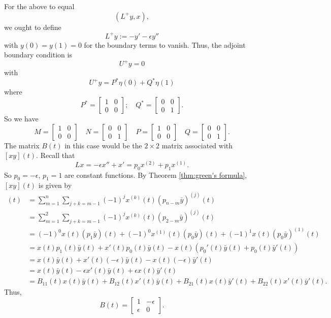 \documentclass[11pt, oneside, a4paper]{article}
\begin{document}
For the above to equal
\[(L^+y, x),\]
we ought to define
\[
    L^+y := -y' - \epsilon y''  
\]
with $y(0)=y(1)=0$ for the boundary terms to vanish. Thus, the adjoint boundary condition is
\[U^+y=0\] with
\[U^+y = P^*\eta(0) + Q^*\eta(1)\] where 
\[P^* = \begin{bmatrix} 1 & 0\\0 & 0 \end{bmatrix};\quad 
Q^* = \begin{bmatrix} 0 & 0\\ 0 & 1\end{bmatrix}.\]
So we have
\[M = \begin{bmatrix} 1 & 0\\0 & 0 \end{bmatrix} \quad 
N = \begin{bmatrix} 0 & 0\\ 0 & 1\end{bmatrix} \quad
P = \begin{bmatrix} 1 & 0\\0 & 0 \end{bmatrix} \quad 
Q = \begin{bmatrix} 0 & 0\\ 0 & 1\end{bmatrix}.\]
The matrix $B(t)$ in this case would be the $2\times 2$ matrix associated with $[xy](t)$. Recall that 
\[Lx = -\epsilon x'' + x'= p_0x^{(2)} + p_1x^{(1)}.\]
So $p_0=-\epsilon$, $p_1=1$ are constant functions.
By Theorem \ref{thm:green's formula}, $[xy](t)$ is given by
\begin{align*}
    [xy](t) &= \sum_{m=1}^n\sum_{j+k=m-1}(-1)^j x^{(k)}(t)(p_{n-m}\bar{y})^{(j)}(t)\\
    &= \sum_{m=1}^2\sum_{j+k=m-1}(-1)^j x^{(k)}(t)(p_{2-m}\bar{y})^{(j)}(t)\\
    &= (-1)^0x(t)(p_1\bar{y})(t) + (-1)^0x^{(1)}(t)(p_0\bar{y})(t) + (-1)^1x(t)(p_0\bar{y})^{(1)}(t)\\
    &= x(t)p_1(t)\bar{y}(t) + x'(t)p_0(t)\bar{y}(t) - x(t)(p_0'(t)\bar{y}(t) + p_0(t)\bar{y}'(t))\\
    &= x(t)\bar{y}(t) + x'(t)(-\epsilon)\bar{y}(t) - x(t)(-\epsilon)\bar{y}'(t)\\
    &= x(t)\bar{y}(t) - \epsilon x'(t)\bar{y}(t) + \epsilon x(t)\bar{y}'(t)\\
    &= B_{11}(t)x(t)\bar{y}(t) + B_{12}(t)x'(t)\bar{y}(t) + B_{21}(t)x(t)\bar{y}'(t) + B_{22}(t)x'(t)\bar{y}'(t).
\end{align*}
Thus,
\[
B(t) = \begin{bmatrix}
1 & -\epsilon\\
\epsilon & 0
\end{bmatrix}.
\]
\end{document}

